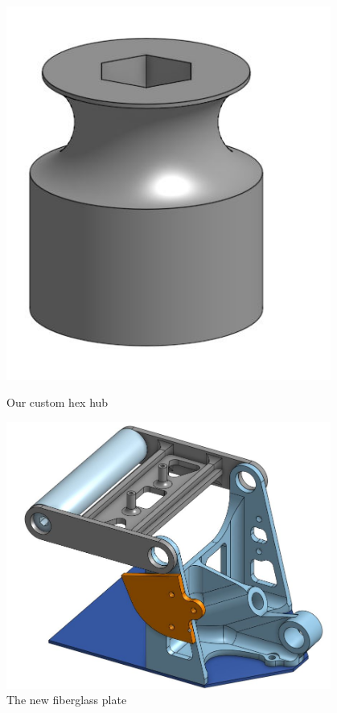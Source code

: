 \begin{figure}[ht]
\centering
\begin{minipage}[b]{.48\textwidth}
  \centering
  \includegraphics[width=0.95\textwidth]{Meetings/November/11-22-21/11-22-21_CAD_Figure3 - Nathan Forrer.JPG}
  \caption{Our custom hex hub}
  \label{fig:112221_3}
\end{minipage}%
\hfill%
\begin{minipage}[b]{.48\textwidth}
  \centering
  \includegraphics[width=0.95\textwidth]{Meetings/November/11-22-21/11-22-21_CAD_Figure4 - Nathan Forrer.JPG}
  \caption{The new fiberglass plate}
  \label{fig:112221_4}
\end{minipage}
\end{figure}


